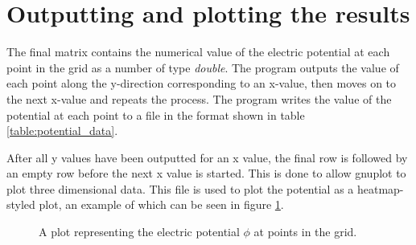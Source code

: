 \documentclass[12pt, a4paper]{article}
\begin{document}
\section{Outputting and plotting the results} %
The final matrix contains the numerical value of the electric potential at each point in the grid as a number of type \emph{double}. The program outputs the value of each point along the y-direction corresponding to an x-value, then moves on to the next x-value and repeats the process. The program writes the value of the potential at each point to a file in the format shown in table \ref{table:potential_data}.

After all y values have been outputted for an x value, the final row is followed by an empty row before the next x value is started. This is done to allow gnuplot to plot three dimensional data. This file is used to plot the potential as a heatmap-styled plot, an example of which can be seen in figure \ref{fig:potentialplot}.

\begin{figure}[h!]
\centering
\setlength\fboxsep{0pt}
\setlength\fboxrule{0.5pt}
\label{fig:potentialplot}
\caption{A plot representing the electric potential ${\phi}$ at points in the grid.}
\end{figure}
\end{document}
